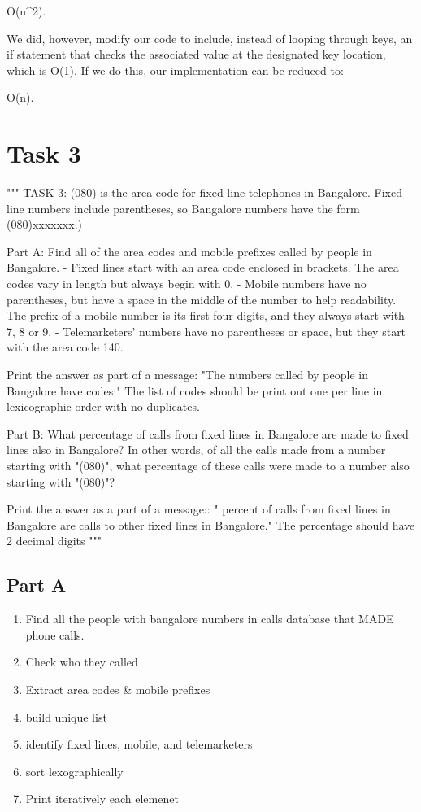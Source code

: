 \documentclass[11pt]{article}
\providecommand{\tightlist}{%
      \setlength{\itemsep}{0pt}\setlength{\parskip}{0pt}}
\begin{document}
O(n\^{}2).

We did, however, modify our code to include, instead of looping through
keys, an if statement that checks the associated value at the designated
key location, which is O(1). If we do this, our implementation can be
reduced to:

O(n).

    \section{Task 3}\label{task-3}

    """ TASK 3: (080) is the area code for fixed line telephones in
Bangalore. Fixed line numbers include parentheses, so Bangalore numbers
have the form (080)xxxxxxx.)

Part A: Find all of the area codes and mobile prefixes called by people
in Bangalore. - Fixed lines start with an area code enclosed in
brackets. The area codes vary in length but always begin with 0. -
Mobile numbers have no parentheses, but have a space in the middle of
the number to help readability. The prefix of a mobile number is its
first four digits, and they always start with 7, 8 or 9. -
Telemarketers' numbers have no parentheses or space, but they start with
the area code 140.

Print the answer as part of a message: "The numbers called by people in
Bangalore have codes:" The list of codes should be print out one per
line in lexicographic order with no duplicates.

Part B: What percentage of calls from fixed lines in Bangalore are made
to fixed lines also in Bangalore? In other words, of all the calls made
from a number starting with "(080)", what percentage of these calls were
made to a number also starting with "(080)"?

Print the answer as a part of a message:: " percent of calls from fixed
lines in Bangalore are calls to other fixed lines in Bangalore." The
percentage should have 2 decimal digits """

    \subsection{Part A}\label{part-a}

    \begin{enumerate}
\def\labelenumi{\arabic{enumi}.}
\tightlist
\item
  Find all the people with bangalore numbers in calls database that MADE
  phone calls.
\item
  Check who they called
\item
  Extract area codes \& mobile prefixes
\item
  build unique list
\item
  identify fixed lines, mobile, and telemarketers
\item
  sort lexographically
\item
  Print iteratively each elemenet
\end{enumerate}
\end{document}
